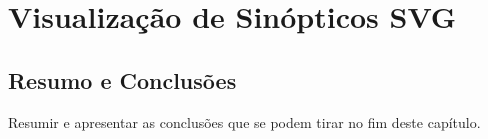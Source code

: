 \chapter{Visualização de Sinópticos SVG}\label{chap:technology}

\section*{}





\section{Resumo e Conclusões}

Resumir e apresentar as conclusões que se podem tirar no fim deste
capítulo.
